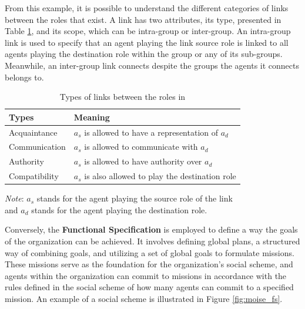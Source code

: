 From this example, it is possible to understand the different categories of links between the roles that exist. A link has two attributes, its type, presented in Table \ref{tab:types_of_links_in_moise}, and its scope, which can be intra-group or inter-group. An intra-group link is used to specify that an agent playing the link source role is linked to all agents playing the destination role within the group or any of its sub-groups. Meanwhile, an inter-group link connects despite the groups the agents it connects belongs to.

\def \sourceagent{$a_s$ }
\def \destagent{$a_d$ }

\begin{table}[!htbp]
    \begin{minipage}{\columnwidth}
        \centering
        \begin{tabular}{l l}
            \toprule
            Types         & Meaning                                                        \\
            \midrule
            Acquaintance  & \sourceagent is allowed to have a representation of \destagent \\
            Communication & \sourceagent is allowed to communicate with \destagent         \\
            Authority     & \sourceagent is allowed to have authority over \destagent      \\
            Compatibility & \sourceagent is also allowed to play the destination role      \\
            \bottomrule
        \end{tabular}
        \begin{center}
            \footnotesize
            \emph{Note}: \sourceagent stands for the agent playing the source role of the link \\
            and \destagent stands for the agent playing the destination role. \\
        \end{center}
    \end{minipage}
    \caption{Types of links between the roles in \MOISEp}
    \label{tab:types_of_links_in_moise}
\end{table}

Conversely, the \textbf{Functional Specification} is employed to define a way the goals of the organization can be achieved. It involves defining global plans, a structured way of combining goals, and utilizing a set of global goals to formulate missions. These missions serve as the foundation for the organization's social scheme, and agents within the organization can commit to missions in accordance with the rules defined in the social scheme of how many agents can commit to a specified mission. An example of a social scheme is illustrated in Figure \ref{fig:moise_fs}.

